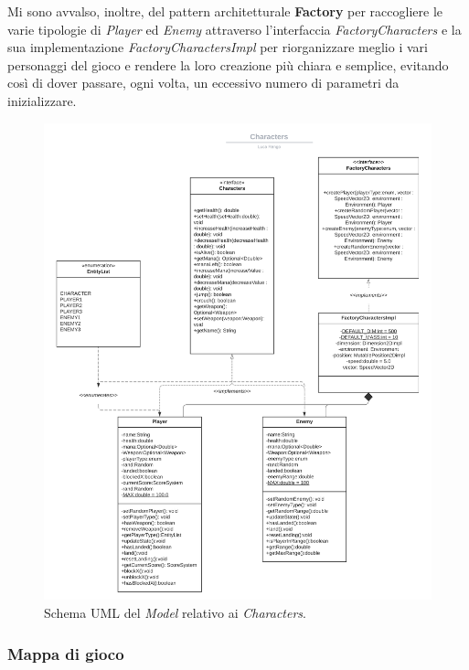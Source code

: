 \textsf{\small Mi sono avvalso, inoltre, del pattern architetturale \textbf{Factory} per raccogliere le varie tipologie di \emph{Player} ed \emph{Enemy} attraverso l'interfaccia \emph{FactoryCharacters} e la sua implementazione \emph{FactoryCharactersImpl} per riorganizzare meglio i vari personaggi del gioco e rendere la loro creazione più chiara e semplice, evitando così di dover passare, ogni volta, un eccessivo numero di parametri da inizializzare.}

\begin{figure}[H]
	\centering{}
	\includegraphics[width=1.3\textwidth]{./img/characters_uml.png} 
	\caption{Schema UML del \emph{Model} relativo ai \emph{Characters}.}
	\label{img:uml_model_characters}
\end{figure}

\subsubsection*{Mappa di gioco} %

